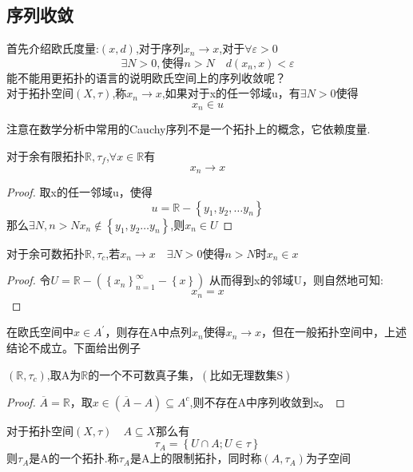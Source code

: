 \subsection*{序列收敛}
首先介绍欧氏度量:\(\left(x,d\right)\),对于序列\(x_n \rightarrow x\),对于\(\forall \varepsilon >0\)
\[\exists N > 0 ,\text{使得} n > N \quad d(x_n,x) < \varepsilon\]
能不能用更拓扑的语言的说明欧氏空间上的序列收敛呢？\\
对于拓扑空间\(\left(X , \tau\right)\),称\(x_n \rightarrow x\),如果对于x的任一邻域u，有\(\exists N >0 \text{使得} \)
\[x_n \in u\]
\begin{note}
    注意在数学分析中常用的Cauchy序列不是一个拓扑上的概念，它依赖度量.
\end{note}
\begin{example}
    对于余有限拓扑\(\mathbb{R} , \tau_f\),\(\forall x \in \mathbb{R}\)有\[x_n \rightarrow x\]
\end{example}
\begin{proof}
    取x的任一邻域u，使得\[u=\mathbb{R}-\left\{y_1,y_2,\dots y_n\right\}\]
    那么\(\exists N , n>N x_n \notin \left\{y_1,y_2 \dots y_n\right\}\),则\(x_n \in U\)
\end{proof}
\begin{example}
    对于余可数拓扑\(\mathbb{R},\tau_c\),若\(x_n \rightarrow x \quad \exists N > 0 \text{使得} n> N \text{时} x_n \in x\)
\end{example}
\begin{proof}
      令\(U=\mathbb{R}-\left({\left\{x_n\right\}}^{\infty}_{n=1} - \left\{x\right\}\right)\) 
     从而得到x的邻域U，则自然地可知:
     \[x_n = x\]                                                                                                                                                                                                                                                                                                                                                                                                                                                                                                                                                                                                                                        
\end{proof}
在欧氏空间中\(x \in A^{'}\)，则存在A中点列\(x_n\)使得\(x_n \rightarrow x\)，但在一般拓扑空间中，上述结论不成立。下面给出例子
\begin{example}
    \(\left(\mathbb{R},\tau_c\right)\),取A为\(\mathbb{R}\)的一个不可数真子集，\(\left(\text{比如无理数集S}\right)\)
\end{example}
\begin{proof}
    \(\overline{A}=\mathbb{R}\)，取\(x \in \left(\overline{A}-A\right) \subseteq A^c\),则不存在A中序列收敛到x。
\end{proof}
对于拓扑空间\(\left(X , \tau\right) \quad A \subseteq X\)那么有
\[\tau_A=\left\{U \cap A ; U \in \tau\right\}\]
则\(\tau_A\)是A的一个拓扑.称\(\tau_A\)是A上的限制拓扑，同时称\(\left(A,\tau_A\right)\)为子空间
